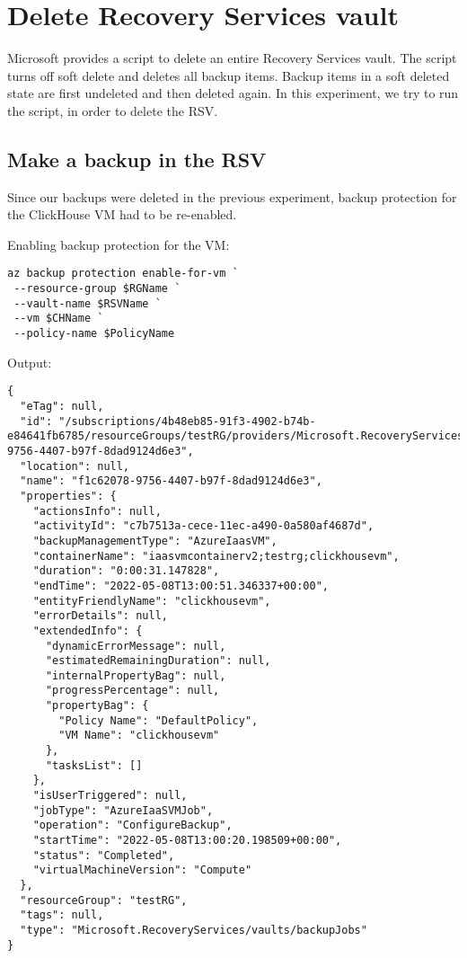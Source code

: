 \section{Delete Recovery Services vault}
\label{app:chs3e2}
Microsoft provides a script to delete an entire Recovery Services vault.
The script turns off soft delete and deletes all backup items.
Backup items in a soft deleted state are first undeleted and then deleted again.
In this experiment, we try to run the script, in order to delete the RSV.

\subsection{Make a backup in the RSV}
\label{sec:org2663d5e}
Since our backups were deleted in the previous experiment,
backup protection for the ClickHouse VM had to be re-enabled.

Enabling backup protection for the VM:
\begin{verbatim}
az backup protection enable-for-vm `
 --resource-group $RGName `
 --vault-name $RSVName `
 --vm $CHName `
 --policy-name $PolicyName
\end{verbatim}

Output:
\begin{verbatim}
{
  "eTag": null,
  "id": "/subscriptions/4b48eb85-91f3-4902-b74b-e84641fb6785/resourceGroups/testRG/providers/Microsoft.RecoveryServices/vaults/myRSV/backupJobs/f1c62078-9756-4407-b97f-8dad9124d6e3",
  "location": null,
  "name": "f1c62078-9756-4407-b97f-8dad9124d6e3",
  "properties": {
    "actionsInfo": null,
    "activityId": "c7b7513a-cece-11ec-a490-0a580af4687d",
    "backupManagementType": "AzureIaasVM",
    "containerName": "iaasvmcontainerv2;testrg;clickhousevm",
    "duration": "0:00:31.147828",
    "endTime": "2022-05-08T13:00:51.346337+00:00",
    "entityFriendlyName": "clickhousevm",
    "errorDetails": null,
    "extendedInfo": {
      "dynamicErrorMessage": null,
      "estimatedRemainingDuration": null,
      "internalPropertyBag": null,
      "progressPercentage": null,
      "propertyBag": {
        "Policy Name": "DefaultPolicy",
        "VM Name": "clickhousevm"
      },
      "tasksList": []
    },
    "isUserTriggered": null,
    "jobType": "AzureIaaSVMJob",
    "operation": "ConfigureBackup",
    "startTime": "2022-05-08T13:00:20.198509+00:00",
    "status": "Completed",
    "virtualMachineVersion": "Compute"
  },
  "resourceGroup": "testRG",
  "tags": null,
  "type": "Microsoft.RecoveryServices/vaults/backupJobs"
}
\end{verbatim}


